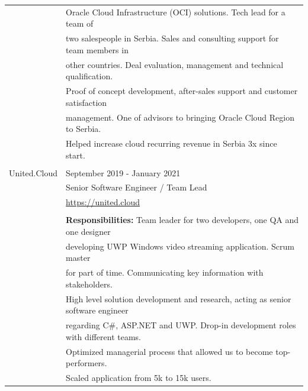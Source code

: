 \documentclass[a4paper]{article}
\begin{document}
\begin{longtable}{@{}r | l}
                   & Oracle Cloud Infrastructure (OCI) solutions. Tech lead for a team of                  \\
                   & two salespeople in Serbia. Sales and consulting support for team members in           \\
                   & other countries. Deal evaluation, management and technical qualification.             \\
                   & Proof of concept development, after-sales support and customer satisfaction           \\
                   & management. One of advisors to bringing Oracle Cloud Region to Serbia.                \\
                   & Helped increase cloud recurring revenue in Serbia 3x since start.                     \\
                   &                                                                                       \\
    United.Cloud   & September 2019 - January 2021                                                         \\
                   & Senior Software Engineer / Team Lead                                                  \\
                   & \href{https://united.cloud}{https://united.cloud}                                     \\
                   &                                                                                       \\
                   & \textbf{Responsibilities:} Team leader for two developers, one QA and one designer    \\
                   & developing UWP Windows video streaming application. Scrum master         \\
                   & for part of time. Communicating key information with stakeholders.             \\
                   & High level solution development and research, acting as senior software engineer      \\
                   & regarding C\#, ASP.NET and UWP. Drop-in development roles with different teams.       \\
                   & Optimized managerial process that allowed us to become top-performers. \\
                   & Scaled application from 5k to 15k users.                                              \\

\end{longtable}
\end{document}
